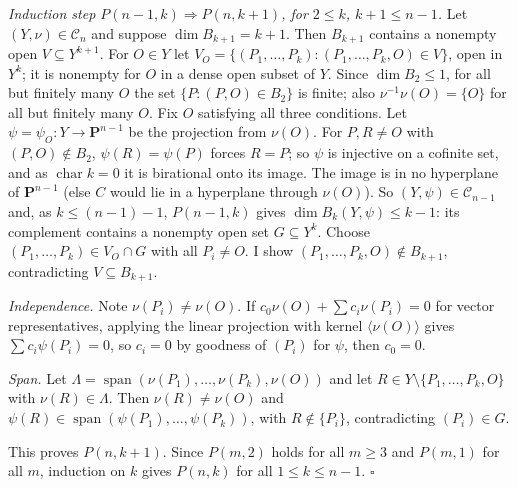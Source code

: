 \documentclass[11pt]{article}
\begin{document}
\emph{Induction step $P(n-1,k)\Rightarrow P(n,k+1)$, for $2\le k$, $k+1\le n-1$.} Let $(Y,\nu)\in\mathcal C_n$ and suppose $\dim B_{k+1}=k+1$. Then $B_{k+1}$ contains a nonempty open $V\subseteq Y^{k+1}$. For $O\in Y$ let $V_O=\{(P_1,\dots,P_k):(P_1,\dots,P_k,O)\in V\}$, open in $Y^k$; it is nonempty for $O$ in a dense open subset of $Y$. Since $\dim B_2\le1$, for all but finitely many $O$ the set $\{P:(P,O)\in B_2\}$ is finite; also $\nu^{-1}\nu(O)=\{O\}$ for all but finitely many $O$. Fix $O$ satisfying all three conditions. Let $\psi=\psi_O:Y\to\mathbf P^{n-1}$ be the projection from $\nu(O)$. For $P,R\ne O$ with $(P,O)\notin B_2$, $\psi(R)=\psi(P)$ forces $R=P$; so $\psi$ is injective on a cofinite set, and as $\operatorname{char}k=0$ it is birational onto its image. The image is in no hyperplane of $\mathbf P^{n-1}$ (else $C$ would lie in a hyperplane through $\nu(O)$). So $(Y,\psi)\in\mathcal C_{n-1}$ and, as $k\le(n-1)-1$, $P(n-1,k)$ gives $\dim B_k(Y,\psi)\le k-1$: its complement contains a nonempty open set $G\subseteq Y^k$. Choose $(P_1,\dots,P_k)\in V_O\cap G$ with all $P_i\ne O$. I show $(P_1,\dots,P_k,O)\notin B_{k+1}$, contradicting $V\subseteq B_{k+1}$.

\emph{Independence.} Note $\nu(P_i)\ne\nu(O)$. If $c_0\nu(O)+\sum c_i\nu(P_i)=0$ for vector representatives, applying the linear projection with kernel $\langle\nu(O)\rangle$ gives $\sum c_i\psi(P_i)=0$, so $c_i=0$ by goodness of $(P_i)$ for $\psi$, then $c_0=0$.

\emph{Span.} Let $\Lambda=\operatorname{span}(\nu(P_1),\dots,\nu(P_k),\nu(O))$ and let $R\in Y\setminus\{P_1,\dots,P_k,O\}$ with $\nu(R)\in\Lambda$. Then $\nu(R)\ne\nu(O)$ and $\psi(R)\in\operatorname{span}(\psi(P_1),\dots,\psi(P_k))$, with $R\notin\{P_i\}$, contradicting $(P_i)\in G$.

This proves $P(n,k+1)$. Since $P(m,2)$ holds for all $m\ge3$ and $P(m,1)$ for all $m$, induction on $k$ gives $P(n,k)$ for all $1\le k\le n-1$. \hfill$\square$
\end{document}
